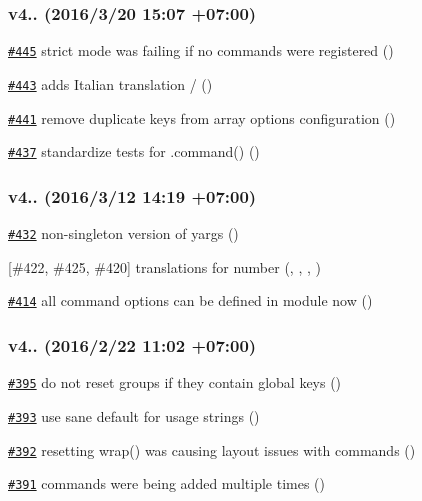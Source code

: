 \subsubsection*{v4.. (2016/3/20 15\+:07 +07\+:00)}


\begin{DoxyItemize}
\item \href{https://github.com/yargs/yargs/pull/445}{\tt \#445} strict mode was failing if no commands were registered ()
\item \href{https://github.com/yargs/yargs/pull/443}{\tt \#443} adds Italian translation / ()
\item \href{https://github.com/yargs/yargs/pull/441}{\tt \#441} remove duplicate keys from array options configuration ()
\item \href{https://github.com/yargs/yargs/pull/437}{\tt \#437} standardize tests for .command() ()
\end{DoxyItemize}

\subsubsection*{v4.. (2016/3/12 14\+:19 +07\+:00)}


\begin{DoxyItemize}
\item \href{https://github.com/yargs/yargs/pull/432}{\tt \#432} non-\/singleton version of yargs ()
\item \mbox{[}\#422, \#425, \#420\mbox{]} translations for number (, , , )
\item \href{https://github.com/yargs/yargs/pull/414}{\tt \#414} all command options can be defined in module now ()
\end{DoxyItemize}

\subsubsection*{v4.. (2016/2/22 11\+:02 +07\+:00)}


\begin{DoxyItemize}
\item \href{https://github.com/yargs/yargs/pull/395}{\tt \#395} do not reset groups if they contain global keys ()
\item \href{https://github.com/yargs/yargs/pull/393}{\tt \#393} use sane default for usage strings ()
\item \href{https://github.com/yargs/yargs/pull/392}{\tt \#392} resetting wrap() was causing layout issues with commands ()
\item \href{https://github.com/yargs/yargs/pull/391}{\tt \#391} commands were being added multiple times ()
\end{DoxyItemize}

